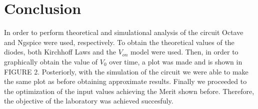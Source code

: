 
\section{Conclusion}
\label{sec:conclusion}


In order to perform theoretical and simulational analysis of the circuit Octave and Ngspice were used, respectively.
To obtain the theoretical values of the diodes, both Kirchhoff Laws and the $V_{on}$ model were used. Then, in order to graphically obtain the value of $V_0$ over time, a plot was made and is shown in FIGURE 2.
Posteriorly, with the simulation of the circuit we were able to make the same plot as before obtaining approximate results.
Finally we proceeded to the optimization of the input values achieving the Merit shown before.
Therefore, the objective of the laboratory was achieved succesfuly.

